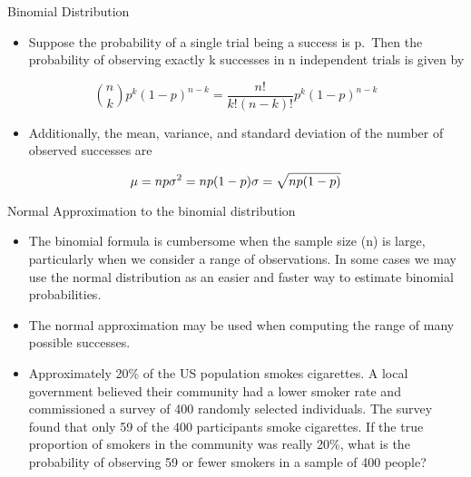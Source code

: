 \documentclass[
  ignorenonframetext,
]{beamer}
\providecommand{\tightlist}{%
  \setlength{\itemsep}{0pt}\setlength{\parskip}{0pt}}
\begin{document}
\begin{frame}{Binomial Distribution}
\protect\hypertarget{binomial-distribution-1}{}

\begin{itemize}
\tightlist
\item
  Suppose the probability of a single trial being a success is p.~Then
  the probability of observing exactly k successes in n independent
  trials is given by
\end{itemize}

\[\binom{n}{k}  p^{k}(1-p)^{n-k} = \frac{n!}{k!(n-k)!} p^{k}(1-p)^{n-k}\]

\begin{itemize}
\tightlist
\item
  Additionally, the mean, variance, and standard deviation of the number
  of observed successes are
\end{itemize}

\[\mu=np\\
\sigma^{2}= np(1-p) \\
\sigma=\sqrt{np(1-p)}\]

\end{frame}

\begin{frame}{Normal Approximation to the binomial distribution}
\protect\hypertarget{normal-approximation-to-the-binomial-distribution}{}

\begin{itemize}
\item
  The binomial formula is cumbersome when the sample size (n) is large,
  particularly when we consider a range of observations. In some cases
  we may use the normal distribution as an easier and faster way to
  estimate binomial probabilities.
\item
  The normal approximation may be used when computing the range of many
  possible successes.
\item
  Approximately 20\% of the US population smokes cigarettes. A local
  government believed their community had a lower smoker rate and
  commissioned a survey of 400 randomly selected individuals. The survey
  found that only 59 of the 400 participants smoke cigarettes. If the
  true proportion of smokers in the community was really 20\%, what is
  the probability of observing 59 or fewer smokers in a sample of 400
  people?
\end{itemize}

\end{frame}
\end{document}
